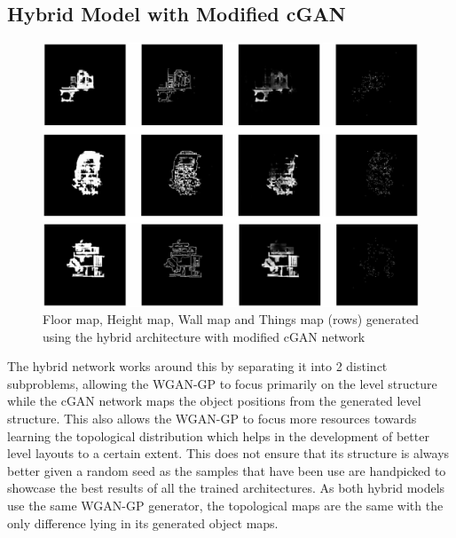 \documentclass{Configuration_Files/PoliMi3i_thesis}
\begin{document}
\subsection{Hybrid Model with Modified cGAN}
\begin{figure}[H]
    \centering
    \includegraphics[width=1\textwidth]{mod_cgan_sample.jpg}
    \caption[Samples generated using the modified cGAN network]{Floor map, Height map, Wall map and Things map (rows) generated 
using the hybrid architecture with modified cGAN network}
    \label{fig:modcgansample}
\end{figure}
The hybrid network works around this by separating it into 2 distinct subproblems, 
allowing the WGAN-GP to focus primarily on the level structure while the cGAN
network maps the object positions from the generated level structure. This also 
allows the WGAN-GP to focus more resources towards learning the topological 
distribution which helps in the development of better level layouts to a certain 
extent. This does not ensure that its structure is always better given a random seed as 
the samples that have been use are handpicked to showcase the best results of 
all the trained architectures. As both hybrid models use the same WGAN-GP generator, the 
topological maps are the same with the only difference lying in its generated object 
maps.
\end{document}
